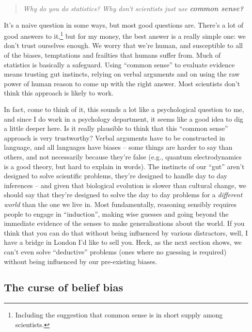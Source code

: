 \documentclass[
]{book}
\begin{document}
\begin{quote}
\emph{Why do you do statistics? Why don't scientists just use \textbf{common sense?}}
\end{quote}

It's a naive question in some ways, but most good questions are. There's a lot of good answers to it,\footnote{Including the suggestion that common sense is in short supply among scientists.} but for my money, the best answer is a really simple one: we don't trust ourselves enough. We worry that we're human, and susceptible to all of the biases, temptations and frailties that humans suffer from. Much of statistics is basically a safeguard. Using ``common sense'' to evaluate evidence means trusting gut instincts, relying on verbal arguments and on using the raw power of human reason to come up with the right answer. Most scientists don't think this approach is likely to work.

In fact, come to think of it, this sounds a lot like a psychological question to me, and since I do work in a psychology department, it seems like a good idea to dig a little deeper here. Is it really plausible to think that this ``common sense'' approach is very trustworthy? Verbal arguments have to be constructed in language, and all languages have biases -- some things are harder to say than others, and not necessarily because they're false (e.g., quantum electrodynamics is a good theory, but hard to explain in words). The instincts of our ``gut'' aren't designed to solve scientific problems, they're designed to handle day to day inferences -- and given that biological evolution is slower than cultural change, we should say that they're designed to solve the day to day problems for a \emph{different world} than the one we live in. Most fundamentally, reasoning sensibly requires people to engage in ``induction'', making wise guesses and going beyond the immediate evidence of the senses to make generalisations about the world. If you think that you can do that without being influenced by various distractors, well, I have a bridge in London I'd like to sell you. Heck, as the next section shows, we can't even solve ``deductive'' problems (ones where no guessing is required) without being influenced by our pre-existing biases.

\hypertarget{the-curse-of-belief-bias}{%
\subsection{The curse of belief bias}\label{the-curse-of-belief-bias}}
\end{document}
